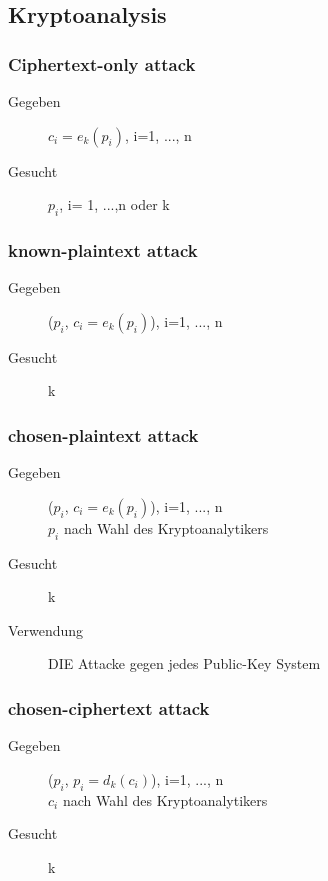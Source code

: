 \documentclass[10pt]{article}
\begin{document}
\subsection{Kryptoanalysis}
\subsubsection{Ciphertext-only attack}
\begin{description}
	\item[Gegeben] $c_i=e_k(p_i)$, i=1, ..., n
	\item[Gesucht] $p_i$, i= 1, ...,n oder k
\end{description}

\subsubsection{known-plaintext attack}
\begin{description}
	\item[Gegeben] ($p_i$, $c_i=e_k(p_i)$), i=1, ..., n
	\item[Gesucht] k
\end{description}

\subsubsection{chosen-plaintext attack}
\begin{description}
	\item[Gegeben] ($p_i$, $c_i=e_k(p_i)$), i=1, ..., n \\
		$p_i$ nach Wahl des Kryptoanalytikers
	\item[Gesucht] k
	\item[Verwendung] DIE Attacke gegen jedes Public-Key System
\end{description}

\subsubsection{chosen-ciphertext attack}
\begin{description}
	\item[Gegeben] ($p_i$, $p_i=d_k(c_i)$), i=1, ..., n \\
		$c_i$ nach Wahl des Kryptoanalytikers
	\item[Gesucht] k
\end{description}
\pagebreak
\end{document}
